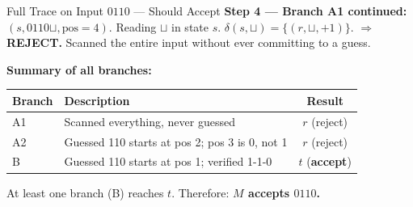 \begin{examplebox}{Full Trace on Input $0110$ --- Should Accept}
\textbf{Step 4 --- Branch A1 continued:} $(s, 0110\sqcup, \text{pos}=4)$.
Reading $\sqcup$ in state $s$. $\delta(s, \sqcup) = \{(r, \sqcup, +1)\}$.
$\Rightarrow$ \textcolor{red!70!black}{\textbf{REJECT.}} Scanned the entire
input without ever committing to a guess.

\textbf{Summary of all branches:}
\begin{center}
\renewcommand{\arraystretch}{1.3}
\begin{tabular}{llc}
\toprule
\textbf{Branch} & \textbf{Description} & \textbf{Result} \\
\midrule
A1 & Scanned everything, never guessed & $r$ (reject) \\
A2 & Guessed 110 starts at pos 2; pos 3 is 0, not 1 & $r$ (reject) \\
B  & Guessed 110 starts at pos 1; verified 1-1-0 & $t$ (\textbf{accept}) \\
\bottomrule
\end{tabular}
\end{center}

At least one branch (B) reaches $t$. Therefore: \textbf{$M$ accepts $0110$.}

\end{examplebox}

